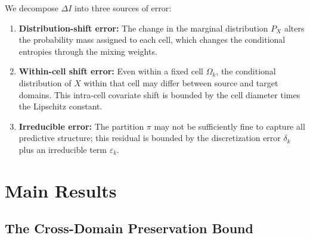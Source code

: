 \documentclass[12pt,a4paper]{article}
\begin{document}
\medskip\noindent
We decompose $\Delta I$ into three sources of error:

\begin{enumerate}[label=(\roman*)]
    \item \textbf{Distribution-shift error:} The change in the marginal
          distribution $P_X$ alters the probability mass assigned to
          each cell, which changes the conditional entropies through the
          mixing weights.
    \item \textbf{Within-cell shift error:} Even within a fixed cell
          $\Omega_k$, the conditional distribution of $X$ within that
          cell may differ between source and target domains.  This
          intra-cell covariate shift is bounded by the cell diameter times
          the Lipschitz constant.
    \item \textbf{Irreducible error:} The partition $\pi$ may not be
          sufficiently fine to capture all predictive structure;
          this residual is bounded by the discretization error $\delta_k$
          plus an irreducible term $\varepsilon_k$.
\end{enumerate}

\section{Main Results}
\label{sec:main}

\subsection{The Cross-Domain Preservation Bound}
\end{document}
